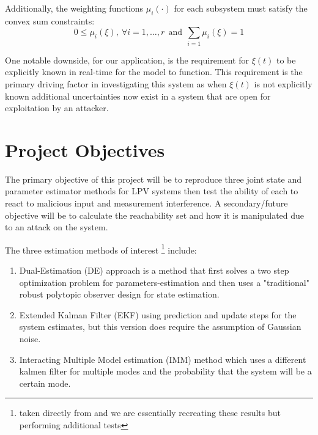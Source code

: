 \documentclass[]{article}
\begin{document}
Additionally, the weighting functions $\mu_i (\cdot)$ for each subsystem must satisfy the convex sum constraints:
\begin{equation}\label{eq:convex_sum_constraints}
	0 \leq \mu_i(\xi), \ \forall i = 1,\dots,r \ \ \text{and} \ \ \sum_{i=1} \mu_i(\xi) = 1
\end{equation}


One notable downside, for our application, is the requirement for $\xi(t)$ to be explicitly known in real-time for the model to function. This requirement is the primary driving factor in investigating this system as when $\xi(t)$ is not explicitly known additional uncertainties now exist in a system that are open for exploitation by an attacker.

\section{Project Objectives}
The primary objective of this project will be to reproduce three joint state and parameter estimator methods for LPV systems then test the ability of each to react to malicious input and measurement interference. A secondary/future objective will be to calculate the reachability set and how it is manipulated due to an attack on the system.

The three estimation methods of interest \footnote{taken directly from \cite{beelen2017joint} and we are essentially recreating these results but performing additional tests} include:
\begin{enumerate}
	\item Dual-Estimation (DE) approach is a method that first solves a two step optimization problem for parameters-estimation and then uses a "traditional" robust polytopic observer design for state estimation. \cite{beelen2017joint}
	\item Extended Kalman Filter (EKF) using prediction and update steps for the system estimates, but this version does require the assumption of Gaussian noise. \cite{beelen2017joint}
	\item Interacting Multiple Model estimation (IMM) method which uses a different kalmen filter for multiple modes and the probability that the system will be a certain mode.\cite{bar2004estimation}
\end{enumerate}
\end{document}
